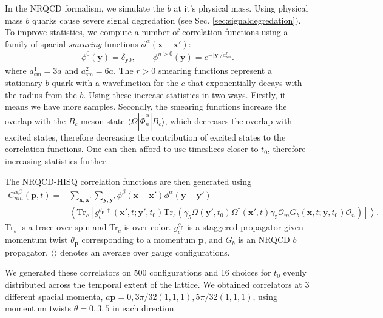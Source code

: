 In the NRQCD formalism, we simulate the $b$ at it's physical mass. Using physical mass $b$ quarks cause severe signal degredation (see Sec. \ref{sec:signaldegredation}). To improve statistics, we compute a number of correlation functions using a family of spacial {\it{smearing}} functions $\phi^{\alpha}({\textbf{x}}-{\textbf{x}}')$:
\begin{align}
  \phi^0({\textbf{y}}) = \delta_{\textbf{y}0},\quad\quad
  \phi^{n>0}({\textbf{y}}) = e^{-|{\textbf{y}}|/a^r_{\text{sm}}}.
  \label{eq:smearings}
\end{align}
where $a^1_{\text{sm}} = 3a$ and $a^2_{\text{sm}} = 6a$. The $r>0$ smearing functions represent a stationary $b$ quark with a wavefunction for the $c$ that exponentially decays with the radius from the $b$. Using these increase statistics in two ways. Firstly, it means we have more samples. Secondly, the smearing functions increase the overlap with the $B_c$ meson state $\langle \Omega | \tilde{\Phi}_n^{\alpha}|B_c\rangle$, which decreases the overlap with excited states, therefore decreasing the contribution of excited states to the correlation functions. One can then afford to use timeslices closer to $t_0$, therefore increasing statistics further.

The NRQCD-HISQ correlation functions are then generated using
\begin{align}
    \label{eq:nrqcd-hisq-2pt}
  C_{nm}^{\alpha \beta}({\textbf{p}},t) =& \sum_{{\textbf{x}},{\textbf{x}}'} \sum_{{\textbf{y}},{\textbf{y}}'}
  \phi^{\beta}({\textbf{x}}-{\textbf{x}}') \phi^{\alpha}({\textbf{y}}-{\textbf{y}}') \\ \nonumber
  &\left\langle \text{Tr}_c \left[  g^{\theta_{\textbf{p}}\,\dagger}_c({\textbf{x}}',t;{\textbf{y}}',t_0) \text{Tr}_s\left( \gamma_5\Omega({\textbf{y}}',t_0) \Omega^{\dagger}({\textbf{x}}',t) \gamma_5 \mathcal{O}_m G_b({\textbf{x}},t;{\textbf{y}},t_0) \mathcal{O}_n \right) \right]\right\rangle.
\end{align}
Tr$_s$ is a trace over spin and Tr$_c$ is over color. $g^{\theta_{\textbf{p}}}_c$ is a staggered propagator given momentum twist $\theta_{\textbf{p}}$ corresponding to a momentum ${\textbf{p}}$, and $G_b$ is an NRQCD $b$ propagator. $\langle\rangle$ denotes an average over gauge configurations.

We generated these correlators on 500 configurations and 16 choices for $t_0$ evenly distributed across the temporal extent of the lattice. We obtained correlators at 3 different spacial momenta, $a\textbf{p} = 0, 3\pi/32(1,1,1), 5\pi/32(1,1,1)$, using momentum twists $\theta=0,3,5$ in each direction.

